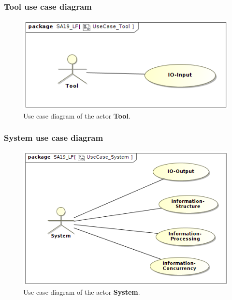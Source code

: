 \subsubsection{Tool use case diagram}
\begin{figure}[H]
\centering
\includegraphics[width=\textwidth]{img/UseCase_Tool.png}
\caption{Use case diagram of the actor \textbf{Tool}.}
\end{figure}

\subsubsection{System use case diagram}
\begin{figure}[H]
\centering
\includegraphics[width=\textwidth]{img/UseCase_System.png}
\caption{Use case diagram of the actor \textbf{System}.}
\end{figure}

